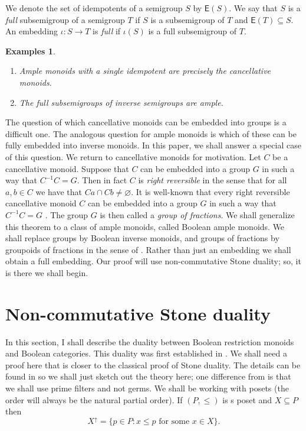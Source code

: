 \documentclass[a4paper]{amsart}
\newtheorem{examples}[theorem]{Examples}
\begin{document}
We denote the set of idempotents of a semigroup $S$ by $\mathsf{E}(S)$.
We say that $S$ is a {\em full} subsemigroup of a semigroup $T$
if $S$ is a subsemigroup of $T$ and $\mathsf{E}(T) \subseteq S$.
An embedding $\iota \colon S \rightarrow T$ is {\em full} if $\iota (S)$ is a full subsemigroup of $T$.



\begin{examples}\mbox{}
{\em 
\begin{enumerate}
\item Ample monoids with a single idempotent are precisely the cancellative monoids.
\item The full subsemigroups of inverse semigroups are ample.  
\end{enumerate}
}
\end{examples}
The question of which cancellative monoids can be embedded into groups is a difficult one.
The analogous question for ample monoids is which of these can be fully embedded into inverse monoids.
In this paper, we shall answer a special case of this question.
We return to cancellative monoids for motivation.
Let $C$ be a cancellative monoid. 
Suppose that $C$ can be embedded into a group $G$ in such a way that $C^{-1}C = G$.
Then in fact $C$ is {\em right reversible} in the sense that for all $a,b \in C$ we have that $Ca \cap Cb \neq \varnothing$.
It is well-known that every right reversible cancellative monoid $C$ can be embedded into a group $G$ in such a way that $C^{-1}C = G$ \cite{CP}.
The group $G$ is then called a {\em group of fractions}.
We shall generalize this theorem to a class of ample monoids, called Boolean ample monoids.
We shall replace groups by Boolean inverse monoids,
and groups of fractions by groupoids of fractions in the sense of \cite{GZ}.
Rather than just an embedding we shall obtain a full embedding.
Our proof will use non-commutative Stone duality;
so, it is there we shall begin.

\section{Non-commutative Stone duality}

In this section, I shall describe the duality between Boolean restriction monoids and Boolean categories.
This duality was first established in \cite{KL}.
We shall need a proof here that is closer to the classical proof of Stone duality.
The details can be found in \cite{K2025} so we shall just sketch out the theory here;
one difference from \cite{K2025} is that we shall use prime filters and not germs.
We shall be working with posets  (the order will always be the natural partial order).
If $(P,\leq)$ is s poset and $X \subseteq P$ then 
$$X^{\uparrow} = \{p \in P \colon x \leq p \text{ for some } x \in X\}.$$
\end{document}
